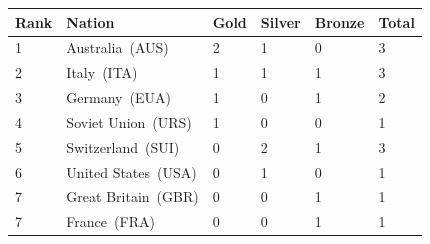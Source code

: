 \documentclass{article}
\begin{document}
\begin{tabular}{llllll}
\toprule
Rank & Nation & Gold & Silver & Bronze & Total \\
\midrule
1 & Australia (AUS) & 2 & 1 & 0 & 3 \\
2 & Italy (ITA) & 1 & 1 & 1 & 3 \\
3 & Germany (EUA) & 1 & 0 & 1 & 2 \\
4 & Soviet Union (URS) & 1 & 0 & 0 & 1 \\
5 & Switzerland (SUI) & 0 & 2 & 1 & 3 \\
6 & United States (USA) & 0 & 1 & 0 & 1 \\
7 & Great Britain (GBR) & 0 & 0 & 1 & 1 \\
7 & France (FRA) & 0 & 0 & 1 & 1 \\
\bottomrule
\end{tabular}
\end{document}
